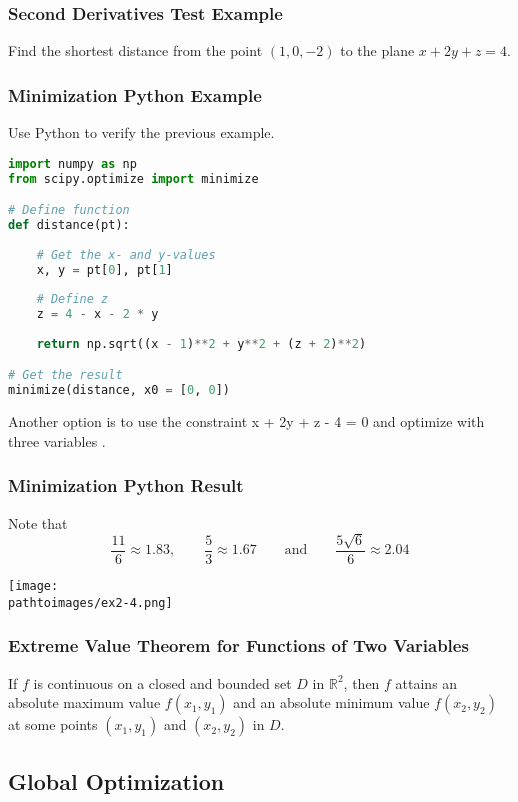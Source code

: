 \documentclass{beamer}
\newcommand{\pathtoimages}{/Users/charlesrambo/Desktop/Bootcamp24/Images}
\begin{document}
\begin{frame}[t]
\frametitle{Second Derivatives Test Example}
\begin{Example}
Find the shortest distance from the point $(1, 0, -2)$ to the plane $x + 2y + z = 4$.
\end{Example}
\end{frame}

\begin{frame}[fragile]
\frametitle{Minimization Python Example}
\small

\begin{Example}
Use Python to verify the previous example.
\end{Example}

\begin{lstlisting}[language=Python]
import numpy as np
from scipy.optimize import minimize

# Define function
def distance(pt):
    
    # Get the x- and y-values
    x, y = pt[0], pt[1]
    
    # Define z 
    z = 4 - x - 2 * y
    
    return np.sqrt((x - 1)**2 + y**2 + (z + 2)**2)

# Get the result   
minimize(distance, x0 = [0, 0]) 
\end{lstlisting}
Another option is to use the constraint x + 2y + z - 4 = 0 and optimize with three variables .
\end{frame}

\begin{frame}
\frametitle{Minimization Python Result}
Note that
$$
\frac{11}{6} \approx 1.83,\qquad \frac{5}{3} \approx 1.67\qquad\text{and}\qquad \frac{5\sqrt{6}}{6}\approx 2.04
$$
\begin{center}
\texttt{[image: \\pathtoimages/ex2-4.png]}
\end{center}
\end{frame}

\begin{frame}
\frametitle{Extreme Value Theorem for Functions of Two Variables}
\begin{Theorem}
If $f$ is continuous on a closed and bounded set $D$ in $\mathbb{R}^2$, then $f$ attains an absolute maximum value $f(x_1, y_1)$ and an absolute minimum value $f(x_2, y_2)$ at some points $(x_1, y_1)$ and $(x_2, y_2)$ in $D$.
\end{Theorem}
\end{frame}

\subsection{Global Optimization}
\end{document}
